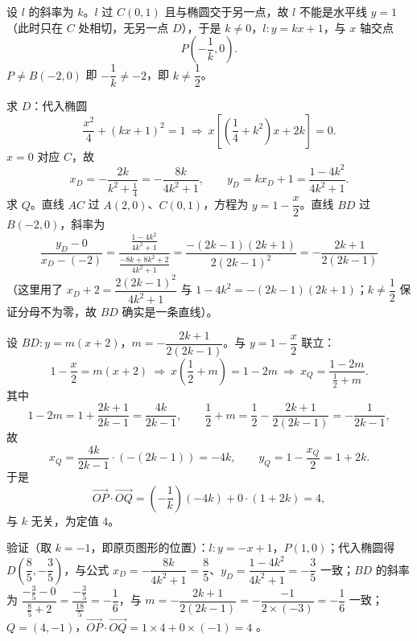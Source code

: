 \begin{answer}

设 $l$ 的斜率为 $k$。$l$ 过 $C(0,1)$ 且与椭圆交于另一点，故 $l$ 不能是水平线 $y=1$（此时只在 $C$ 处相切，无另一点 $D$），于是 $k\neq0$，$l:y=kx+1$，与 $x$ 轴交点
\nopagebreak[4]
\[
P\left(-\frac1k,0\right).
\]
$P\neq B(-2,0)$ 即 $-\dfrac1k\neq-2$，即 $k\neq\dfrac12$。

求 $D$：代入椭圆
\nopagebreak[4]
\[
\frac{x^2}{4}+(kx+1)^2=1\ \Longrightarrow\ x\left[\left(\frac14+k^2\right)x+2k\right]=0.
\]
$x=0$ 对应 $C$，故
\nopagebreak[4]
\[
x_D=-\frac{2k}{k^2+\frac14}=-\frac{8k}{4k^2+1},\qquad
y_D=kx_D+1=\frac{1-4k^2}{4k^2+1}.
\]
求 $Q$。直线 $AC$ 过 $A(2,0)$、$C(0,1)$，方程为 $y=1-\dfrac x2$。直线 $BD$ 过 $B(-2,0)$，斜率为
\nopagebreak[4]
\[
\frac{y_D-0}{x_D-(-2)}=\frac{\frac{1-4k^2}{4k^2+1}}{\frac{-8k+8k^2+2}{4k^2+1}}
=\frac{-(2k-1)(2k+1)}{2(2k-1)^2}=-\frac{2k+1}{2(2k-1)}
\]
（这里用了 $x_D+2=\dfrac{2(2k-1)^2}{4k^2+1}$ 与 $1-4k^2=-(2k-1)(2k+1)$；$k\neq\dfrac12$ 保证分母不为零，故 $BD$ 确实是一条直线）。

设 $BD:y=m(x+2)$，$m=-\dfrac{2k+1}{2(2k-1)}$。与 $y=1-\dfrac x2$ 联立：
\nopagebreak[4]
\[
1-\frac x2=m(x+2)\ \Longrightarrow\ x\left(\frac12+m\right)=1-2m\ \Longrightarrow\ x_Q=\frac{1-2m}{\frac12+m}.
\]
其中
\nopagebreak[4]
\[
1-2m=1+\frac{2k+1}{2k-1}=\frac{4k}{2k-1},\qquad
\frac12+m=\frac12-\frac{2k+1}{2(2k-1)}=-\frac{1}{2k-1},
\]
故
\nopagebreak[4]
\[
x_Q=\frac{4k}{2k-1}\cdot\left(-(2k-1)\right)=-4k,\qquad y_Q=1-\frac{x_Q}{2}=1+2k.
\]
于是
\nopagebreak[4]
\[
\overrightarrow{OP}\cdot\overrightarrow{OQ}=\left(-\frac1k\right)(-4k)+0\cdot(1+2k)=4,
\]
与 $k$ 无关，为定值 $4$。

验证（取 $k=-1$，即原页图形的位置）：$l:y=-x+1$，$P(1,0)$；代入椭圆得 $D\left(\dfrac85,-\dfrac35\right)$，与公式 $x_D=-\dfrac{8k}{4k^2+1}=\dfrac85$、$y_D=\dfrac{1-4k^2}{4k^2+1}=-\dfrac35$ 一致；$BD$ 的斜率为 $\dfrac{-\frac35-0}{\frac85+2}=\dfrac{-\frac35}{\frac{18}{5}}=-\dfrac16$，与 $m=-\dfrac{2k+1}{2(2k-1)}=-\dfrac{-1}{2\times(-3)}=-\dfrac16$ 一致；$Q=(4,-1)$，$\overrightarrow{OP}\cdot\overrightarrow{OQ}=1\times4+0\times(-1)=4$ 。



\end{answer}
